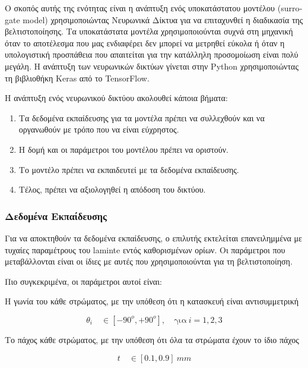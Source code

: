 Ο σκοπός αυτής της ενότητας είναι η ανάπτυξη ενός υποκατάστατου μοντέλου (\textlatin{surrogate model}) χρησιμοποιώντας Νευρωνικά Δίκτυα για να επιταχυνθεί η διαδικασία της βελτιστοποίησης. Τα υποκατάστατα μοντέλα χρησιμοποιούνται συχνά στη μηχανική όταν το αποτέλεσμα που μας ενδιαφέρει δεν μπορεί να μετρηθεί εύκολα ή όταν η υπολογιστική προσπάθεια που απαιτείται για την κατάλληλη προσομοίωση είναι πολύ μεγάλη. Η ανάπτυξη των νευρωνικών δικτύων γίνεται στην \textlatin{Python} χρησιμοποιώντας τη βιβλιοθήκη \textlatin{Keras} από το \textlatin{TensorFlow}.

Η ανάπτυξη ενός νευρωνικού δικτύου ακολουθεί κάποια βήματα:

\begin{enumerate}
\def\labelenumi{\arabic{enumi}.}
\item
  Τα δεδομένα εκπαίδευσης για τα μοντέλα πρέπει να συλλεχθούν και να οργανωθούν με τρόπο που να είναι εύχρηστος.
\item
  Η δομή και οι παράμετροι του μοντέλου πρέπει να οριστούν.
\item
  Το μοντέλο πρέπει να εκπαιδευτεί με τα δεδομένα εκπαίδευσης.
\item
  Τέλος, πρέπει να αξιολογηθεί η απόδοση του δικτύου. 
\end{enumerate}

\subsubsection{Δεδομένα Εκπαίδευσης}

Για να αποκτηθούν τα δεδομένα εκπαίδευσης, ο επιλυτής εκτελείται επανειλημμένα με τυχαίες παραμέτρους του \textlatin{laminte} εντός καθορισμένων ορίων. Οι παράμετροι που μεταβάλλονται είναι οι ίδιες με αυτές που χρησιμοποιούνται για τη βελτιστοποίηση.

Πιο συγκεκριμένα, οι παράμετροι αυτοί είναι:

Η γωνία του κάθε στρώματος, με την υπόθεση ότι η κατασκευή είναι αντισυμμετρική

\begin{equation}
\theta_{i} \quad \in [ - 90^{o}, + 90^{o}], \quad \text{για}\ i = 1,2,3
\end{equation}

Το πάχος κάθε στρώματος, με την υπόθεση ότι όλα τα στρώματα έχουν το ίδιο πάχος

\begin{equation}
t \quad \in [ 0.1, 0.9]\ mm
\end{equation}

